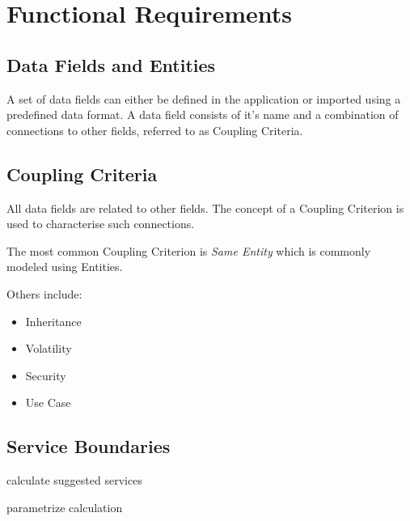 \section{Functional Requirements}


\subsection{Data Fields and Entities}

A set of data fields can either be defined in the application or imported using a predefined data format. A data field consists of it's name and a combination of connections to other fields, referred to as Coupling Criteria.

\subsection{Coupling Criteria}

All data fields are related to other fields. The concept of a Coupling Criterion is used to characterise such connections.

The most common Coupling Criterion is \textit{Same Entity} which is commonly modeled using Entities. %

Others include:

\begin{itemize}
	\item Inheritance
	\item Volatility
	\item Security
	\item Use Case
\end{itemize}


\subsection{Service Boundaries}

calculate suggested services

parametrize calculation

